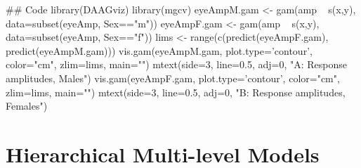 \documentclass{tufte-book}\usepackage[]{graphicx}\usepackage[]{color}
\begin{document}
\begin{fullwidth}

\begin{Schunk}
\begin{Sinput}
## Code
library(DAAGviz)
library(mgcv)
eyeAmpM.gam <- gam(amp ~ s(x,y), data=subset(eyeAmp, Sex=="m"))
eyeAmpF.gam <- gam(amp ~ s(x,y), data=subset(eyeAmp, Sex=="f"))
lims <- range(c(predict(eyeAmpF.gam), predict(eyeAmpM.gam)))
vis.gam(eyeAmpM.gam, plot.type='contour', color="cm", zlim=lims, main="")
mtext(side=3, line=0.5, adj=0, "A: Response amplitudes, Males")
vis.gam(eyeAmpF.gam, plot.type='contour', color="cm", zlim=lims, main="")
mtext(side=3, line=0.5, adj=0, "B: Response amplitudes, Females")
\end{Sinput}
\end{Schunk}

\end{fullwidth}

\section{Hierarchical Multi-level Models}\label{sec:hmlm}
\end{document}
